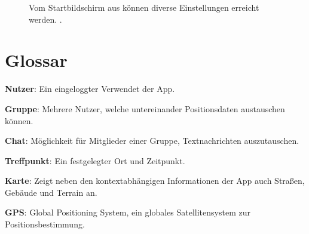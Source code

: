 \documentclass[parskip=full,11pt]{scrartcl}
\begin{document}
\begin{figure}[hb]
		\caption{\label{fig:map}
			Vom Startbildschirm aus können diverse Einstellungen erreicht werden.
			.
		}
\end{figure}

\section{Glossar}

\textbf{Nutzer}:
Ein eingeloggter Verwendet der App.

\textbf{Gruppe}:
Mehrere Nutzer, welche untereinander Positionsdaten austauschen können.

\textbf{Chat}:
Möglichkeit für Mitglieder einer Gruppe, Textnachrichten auszutauschen.

\textbf{Treffpunkt}:
Ein festgelegter Ort und Zeitpunkt.

\textbf{Karte}:
Zeigt neben den kontextabhängigen Informationen der App auch Straßen, Gebäude und Terrain an.

\textbf{GPS}:
Global Positioning System, ein globales Satellitensystem zur Positionsbestimmung.
\end{document}
